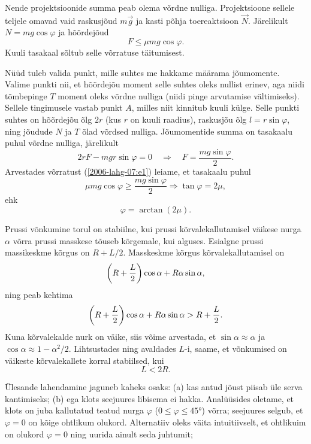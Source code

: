 \documentclass[10pt, twoside]{article}
\begin{document}
{Nende projektsioonide summa peab olema võrdne nulliga. Projektsioone sellele teljele omavad vaid raskusjõud $m\vec g$ ja kasti põhja toereaktsioon $\vec N$. Järelikult
$N = mg \cos \varphi$ ja hõõrdejõud
\begin{equation} \label{2006-lahg-07:e1}
F \leq \mu mg \cos\varphi.
\end{equation}
Kuuli tasakaal sõltub selle võrratuse täitumisest.

Nüüd tuleb valida punkt, mille suhtes me hakkame määrama jõumomente. Valime punkti nii, et hõõrdejõu moment selle suhtes oleks nullist erinev, aga niidi tõmbepinge $T$ moment oleks võrdne nulliga (niidi pinge arvutamise vältimiseks). Sellele tingimusele vastab punkt $A$, milles niit kinnitub kuuli külge. Selle punkti suhtes on hõõrdejõu õlg $2r$ (kus $r$ on kuuli raadius), raskusjõu õlg $l = r \sin \varphi$, ning jõudude $N$ ja $T$ õlad võrdsed nulliga. Jõumomentide summa on tasakaalu puhul võrdne nulliga, järelikult
\[
2 r F-m g r \sin \varphi=0 \quad \Rightarrow \quad F=\frac{m g \sin \varphi}{2}.
\]
Arvestades võrratust (\ref{2006-lahg-07:e1}) leiame, et tasakaalu puhul
\[
\mu m g \cos \varphi \geq \frac{m g \sin \varphi}{2} \Rightarrow \tan \varphi=2 \mu,
\]
ehk
\[
\varphi = \arctan (2\mu).
\]
\probend
\bigskip


\solu
Prussi võnkumine torul on stabiilne, kui prussi
kõrvalekallutamisel väikese nurga $\alpha$ võrra prussi masskese
tõuseb kõrgemale, kui alguses. Esialgne prussi massikeskme kõrgus on $R+L/2$.
Masskeskme kõrgus kõrvalekallutamisel on
\[\left(R+{L \over 2}\right)\cos\alpha+R\alpha\sin\alpha,\]
ning peab kehtima
\[\left(R+{L \over 2}\right)\cos\alpha+R\alpha\sin\alpha >R+{L \over 2}.\]
Kuna kõrvalekalde nurk on väike, siis võime arvestada, et
$\sin\alpha\approx \alpha$ ja $\cos\alpha\approx 1-\alpha^2/2$. Lihtsustades ning avaldades $L$-i, saame, et võnkumised on väikeste kõrvalekallete korral stabiilsed, kui
\[L<2R.\]
\probend
\bigskip


\solu
Ülesande lahendamine jaguneb kaheks osaks: (a) kas antud jõust piisab üle serva kantimiseks; (b) ega klots seejuures libisema ei hakka. Analüüsides oletame, et klots on juba kallutatud teatud nurga $\varphi$ ($0 \leq \varphi \leq \ang{45}$) võrra; seejuures selgub, et $\varphi = 0$ on kõige ohtlikum olukord. Alternatiiv oleks väita intuitiivselt, et ohtlikuim on olukord $\varphi = 0$ ning uurida ainult seda juhtumit;

}
\end{document}
